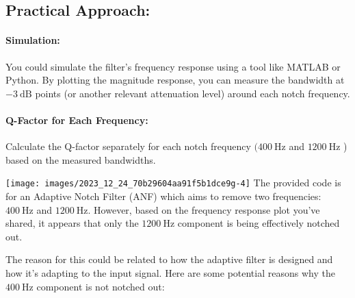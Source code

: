 \subsection{Practical Approach:}

\paragraph{Simulation:} You could simulate the filter's frequency response using a tool like MATLAB or Python. By plotting the magnitude response, you can measure the bandwidth at $-3 \mathrm{~dB}$ points (or another relevant attenuation level) around each notch frequency.

\paragraph{Q-Factor for Each Frequency:} Calculate the Q-factor separately for each notch frequency $(400 \mathrm{~Hz}$ and $1200 \mathrm{~Hz}$ ) based on the measured bandwidths.

\texttt{[image: images/2023\_12\_24\_70b29604aa91f5b1dce9g-4]}
The provided code is for an Adaptive Notch Filter (ANF) which aims to remove two frequencies: $400 \mathrm{~Hz}$ and $1200 \mathrm{~Hz}$. However, based on the frequency response plot you've shared, it appears that only the $1200 \mathrm{~Hz}$ component is being effectively notched out.

The reason for this could be related to how the adaptive filter is designed and how it's adapting to the input signal. Here are some potential reasons why the $400 \mathrm{~Hz}$ component is not notched out:

